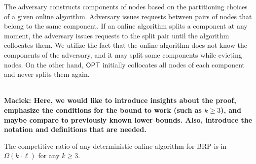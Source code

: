 \documentclass[manuscript,screen=true, review, anonymous]{acmart}
\newcommand{\OPT}{\textsf{OPT}\xspace}
\newcommand{\OBRP}{BRP}
\newcommand\maciek[1]{\color{brown}\textbf{\\ Maciek: #1}\color{black}}
\begin{document}
The adversary constructs components of nodes based on the partitioning choices of a given online algorithm.
Adversary issues requests between pairs of nodes that belong to the same component.
If an online algorithm splits a component at any moment,
the adversary issues requests to the split pair until the algorithm collocates them.
We utilize the fact that the online algorithm does not know the components of the adversary, and it may split some components while evicting nodes.
On the other hand, $\OPT$ initially collocates all nodes of each component and never splits them again.


\maciek{Here, we would like to introduce insights about the proof, emphasize the conditions for the bound to work (such as $k\geq 3$), and maybe compare to previously known lower bounds. Also, introduce the notation and definitions that are needed.}

\begin{theorem}
	The competitive ratio of any deterministic online algorithm for \OBRP{} is in $\Omega(k\cdot \ell)$ for any $k\geq 3$.
\end{theorem}
\end{document}
